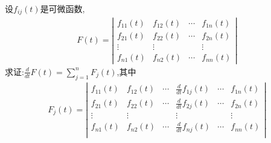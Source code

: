 \documentclass[../../main.tex]{subfiles}
\begin{document}
\begin{proposition}[行列式的求导运算]\label{proposition:行列式的求导运算}
设\(f_{ij}(t)\)是可微函数,
\begin{align*}
F(t) = 
\left| \begin{matrix}
f_{11}(t) & f_{12}(t) & \cdots & f_{1n}(t) \\
f_{21}(t) & f_{22}(t) & \cdots & f_{2n}(t) \\
\vdots & \vdots &  & \vdots \\
f_{n1}(t) & f_{n2}(t) & \cdots & f_{nn}(t)
\end{matrix} \right| 
\nonumber
\end{align*}
求证:$\frac{d}{dt}F\left( t \right) =\sum_{j=1}^n{F_j\left( t \right)}$,其中
\begin{align*}
F_{j}(t) = 
\left| \begin{matrix}
f_{11}(t)&		f_{12}(t)&		\cdots&		\frac{d}{dt}f_{1j}(t)&		\cdots&		f_{1n}(t)\\
f_{21}(t)&		f_{22}(t)&		\cdots&		\frac{d}{dt}f_{2j}(t)&		\cdots&		f_{2n}(t)\\
\vdots&		\vdots&		&		\vdots&		&		\vdots\\
f_{n1}(t)&		f_{n2}(t)&		\cdots&		\frac{d}{dt}f_{nj}(t)&		\cdots&		f_{nn}(t)\\
\end{matrix} \right| 
\nonumber
\end{align*}
\end{proposition}
\end{document}
